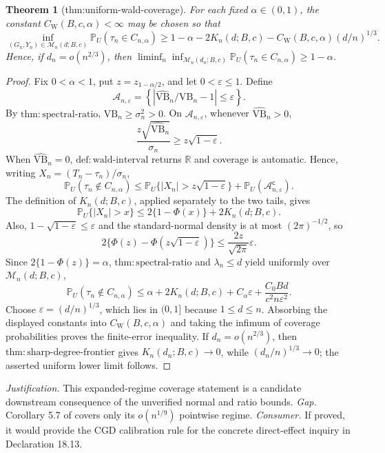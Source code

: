 \documentclass{article}
\newtheorem{theorem}{Theorem}
\begin{document}
\begin{theorem}[thm:uniform-wald-coverage]\label{thm:uniform-wald-coverage}
For each fixed \(\alpha\in(0,1)\), the constant \(C_{\mathrm W}(B,c,\alpha)<\infty\) may be chosen so that \[\inf_{(G_n,Y_n)\in\mathcal M_n(d;B,c)}\mathbb P_U(\tau_n\in C_{n,\alpha})\ge1-\alpha-2K_n(d;B,c)-C_{\mathrm W}(B,c,\alpha)(d/n)^{1/3}.\] Hence, if \(d_n=o(n^{2/3})\), then \(\liminf_n\inf_{\mathcal M_n(d_n;B,c)}\mathbb P_U(\tau_n\in C_{n,\alpha})\ge1-\alpha\).
\end{theorem}
\begin{proof}
Fix \(0<\alpha<1\), put \(z=z_{1-\alpha/2}\), and let \(0<\varepsilon\le1\).  Define
\[
 \mathcal A_{n,\varepsilon}=
 \left\{\left|\widehat{\mathrm{VB}}_n/\mathrm{VB}_n-1\right|\le\varepsilon\right\}.
\]
By \(\mathrm{thm:spectral\text{-}ratio}\), \(\mathrm{VB}_n\ge\sigma_n^2>0\).  On \(\mathcal A_{n,\varepsilon}\), whenever \(\widehat{\mathrm{VB}}_n>0\),
\[
 \frac{z\sqrt{\widehat{\mathrm{VB}}_n}}{\sigma_n}
 \ge z\sqrt{1-\varepsilon}.
\]
When \(\widehat{\mathrm{VB}}_n=0\), \(\mathrm{def:wald\text{-}interval}\) returns \(\mathbb R\) and coverage is automatic.  Hence, writing \(X_n=(T_n-\tau_n)/\sigma_n\),
\[
 \mathbb P_U(\tau_n\notin C_{n,\alpha})
 \le\mathbb P_U\{|X_n|>z\sqrt{1-\varepsilon}\}
 +\mathbb P_U(\mathcal A_{n,\varepsilon}^{\mathsf c}).
\]
The definition of \(K_n(d;B,c)\), applied separately to the two tails, gives
\[
 \mathbb P_U\{|X_n|>x\}\le2\{1-\Phi(x)\}+2K_n(d;B,c).
\]
Also, \(1-\sqrt{1-\varepsilon}\le\varepsilon\) and the standard-normal density is at most \((2\pi)^{-1/2}\), so
\[
 2\{\Phi(z)-\Phi(z\sqrt{1-\varepsilon})\}
 \le\frac{2z}{\sqrt{2\pi}}\varepsilon.
\]
Since \(2\{1-\Phi(z)\}=\alpha\), \(\mathrm{thm:spectral\text{-}ratio}\) and \(\lambda_n\le d\) yield uniformly over \(\mathcal M_n(d;B,c)\),
\[
 \mathbb P_U(\tau_n\notin C_{n,\alpha})
 \le\alpha+2K_n(d;B,c)+C_\alpha\varepsilon
 +\frac{C_0Bd}{c^2n\varepsilon^2}.
\]
Choose \(\varepsilon=(d/n)^{1/3}\), which lies in \((0,1]\) because \(1\le d\le n\).  Absorbing the displayed constants into \(C_{\mathrm W}(B,c,\alpha)\) and taking the infimum of coverage probabilities proves the finite-error inequality.  If \(d_n=o(n^{2/3})\), then \(\mathrm{thm:sharp\text{-}degree\text{-}frontier}\) gives \(K_n(d_n;B,c)\to0\), while \((d_n/n)^{1/3}\to0\); the asserted uniform lower limit follows.
\end{proof}
\par\smallskip\noindent \textit{Justification.} This expanded-regime coverage statement is a candidate downstream consequence of the unverified normal and ratio bounds. \textit{Gap.} Corollary 5.7 of \cite{KandirosPipisDaskalakisHarshaw2024CGD} covers only its \(o(n^{1/9})\) pointwise regime. \textit{Consumer.} If proved, it would provide the CGD calibration rule for the concrete direct-effect inquiry in Declaration 18.13.
\end{document}

